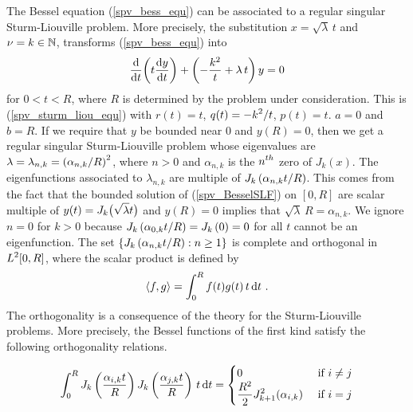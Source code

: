 The Bessel equation (\ref{spv_bess_equ}) can be associated to a
regular singular Sturm-Liouville problem.  More precisely, the
substitution $x= \sqrt{\lambda}\, t$ and $\nu = k \in \NN$, transforms
(\ref{spv_bess_equ}) into
\begin{equation}\label{spv_BesselSLF}
\dfdx{ \left( t \dydx{y}{t}\right)}{t} + \left( - \frac{k^2}{t} +
\lambda\, t\right)  y = 0
\end{equation}
for $0 < t < R$, where $R$ is determined by the problem under
consideration.  This is (\ref{spv_sturm_liou_equ}) with $r(t) = t$,
$\DS q(t)= -k^2/t$,
$p(t)=t$. $a=0$ and $b=R$.  If we require that $y$ be bounded near
$0$ and $y(R)=0$, then we get a regular singular Sturm-Liouville problem
whose eigenvalues are
$\DS \lambda = \lambda_{n,k} = \left(\alpha_{n,k}/R\right)^2$,
where $n > 0$ and $\alpha_{n,k}$ is the $\DS n^{th}$ zero of $J_k(x)$.
The eigenfunctions associated to $\lambda_{n,k}$ are multiple of
$\DS J_k\left(\alpha_{n,k} t/R\right)$.
This comes from the fact that the bounded solution of
(\ref{spv_BesselSLF}) on $[0,R]$ are scalar multiple of
$\DS y(t) = J_k\big(\sqrt{\lambda} t\big)$ and
$y(R) = 0$ implies that $\sqrt{\lambda}\, R = \alpha_{n,k}$.
We ignore $n=0$ for $k>0$ because
$\DS J_k\left(\alpha_{0,k} t/R\right) = J_k\left(0\right) = 0$
for all $t$ cannot be an eigenfunction.  The set
$\DS \left\{ J_k\left(\alpha_{n,k} t/R\right) : n \geq 1 \right\}$
is complete and orthogonal in $\DS L^2[0,R]$, where the
scalar product is defined by
\[
\ps{f}{g} = \int_0^R f(t)g(t) \, t \dx{t} \ .
\]
The orthogonality is a consequence of the theory for the
Sturm-Liouville problems.  More precisely, the Bessel functions of the
first kind satisfy the following orthogonality relations.

\begin{prop}
\[
\int_0^R J_k\left(\frac{\alpha_{i,k} t}{R}\right)
J_k\left(\frac{\alpha_{j,k} t}{R}\right)\, t \dx{t} =
\begin{cases}
0 & \mbox{ if } i \neq j \\
\DS \frac{R^2}{2} J_{k+1}^2(\alpha_{i,k}) & \mbox{ if } i = j
\end{cases}
\]
\end{prop}

